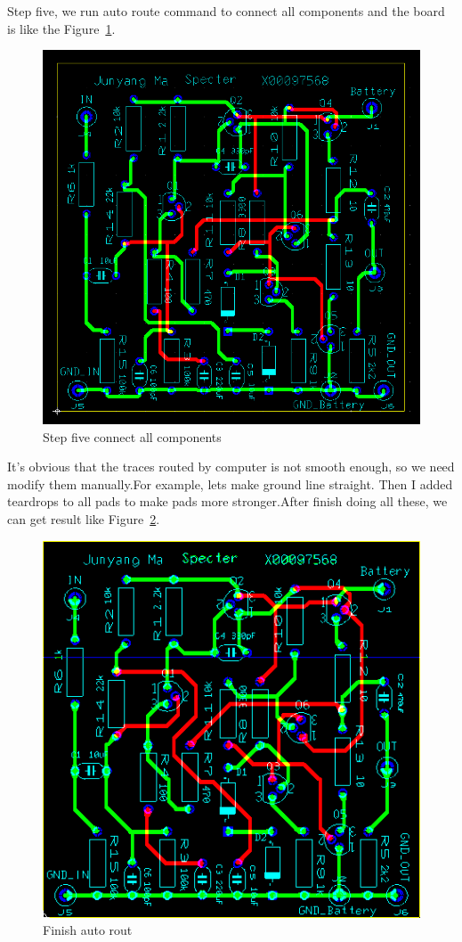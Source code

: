 Step five, we run auto route command to connect all components and the board is like the Figure~\ref{fig:Step five connect all components}.
\begin{figure}[htbp]
	\centering
	\includegraphics[scale=0.6]{"../Photo/Chap6/Step_five_run_autoroute"}
	\caption{Step five connect all components }
	\label{fig:Step five connect all components}
\end{figure}

It's obvious that the traces routed by computer is not smooth enough, so we need modify them manually.For example, lets make ground line straight.
Then I added teardrops to all pads to make pads more stronger.After finish doing all these, we can get result like Figure~\ref{fig:Finsh autorout}.

\begin{figure}[htbp]
	\centering
	\includegraphics[scale=0.9]{"../Photo/Chap6/final PCB all"}
	\caption{Finish auto rout }
	\label{fig:Finsh autorout}
\end{figure}

